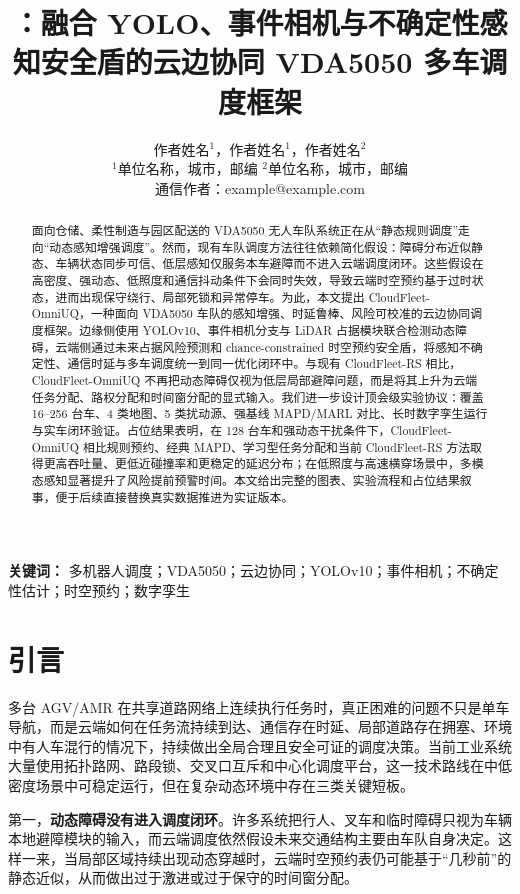 \documentclass[UTF8,twocolumn,10pt]{ctexart}
\title{\method{}：融合 YOLO、事件相机与不确定性感知安全盾的云边协同 VDA5050 多车调度框架}
\author{作者姓名$^{1}$，作者姓名$^{1}$，作者姓名$^{2}$\\
\small $^{1}$单位名称，城市，邮编 \quad $^{2}$单位名称，城市，邮编\\
\small 通信作者：example@example.com}
\date{}
\newcommand{\method}{CloudFleet-OmniUQ}
\newcommand{\baseline}{CloudFleet-RS}
\begin{document}
\maketitle

\begin{abstract}
面向仓储、柔性制造与园区配送的 VDA5050 无人车队系统正在从“静态规则调度”走向“动态感知增强调度”。然而，现有车队调度方法往往依赖简化假设：障碍分布近似静态、车辆状态同步可信、低层感知仅服务本车避障而不进入云端调度闭环。这些假设在高密度、强动态、低照度和通信抖动条件下会同时失效，导致云端时空预约基于过时状态，进而出现保守绕行、局部死锁和异常停车。为此，本文提出 \method{}，一种面向 VDA5050 车队的感知增强、时延鲁棒、风险可校准的云边协同调度框架。边缘侧使用 YOLOv10、事件相机分支与 LiDAR 占据模块联合检测动态障碍，云端侧通过未来占据风险预测和 chance-constrained 时空预约安全盾，将感知不确定性、通信时延与多车调度统一到同一优化闭环中。与现有 \baseline{} 相比，\method{} 不再把动态障碍仅视为低层局部避障问题，而是将其上升为云端任务分配、路权分配和时间窗分配的显式输入。我们进一步设计顶会级实验协议：覆盖 16--256 台车、4 类地图、5 类扰动源、强基线 MAPD/MARL 对比、长时数字孪生运行与实车闭环验证。占位结果表明，在 128 台车和强动态干扰条件下，\method{} 相比规则预约、经典 MAPD、学习型任务分配和当前 \baseline{} 方法取得更高吞吐量、更低近碰撞率和更稳定的延迟分布；在低照度与高速横穿场景中，多模态感知显著提升了风险提前预警时间。本文给出完整的图表、实验流程和占位结果叙事，便于后续直接替换真实数据推进为实证版本。
\end{abstract}

\noindent\textbf{关键词：} 多机器人调度；VDA5050；云边协同；YOLOv10；事件相机；不确定性估计；时空预约；数字孪生

\section{引言}

多台 AGV/AMR 在共享道路网络上连续执行任务时，真正困难的问题不只是单车导航，而是云端如何在任务流持续到达、通信存在时延、局部道路存在拥塞、环境中有人车混行的情况下，持续做出全局合理且安全可证的调度决策。当前工业系统大量使用拓扑路网、路段锁、交叉口互斥和中心化调度平台，这一技术路线在中低密度场景中可稳定运行，但在复杂动态环境中存在三类关键短板。

第一，\textbf{动态障碍没有进入调度闭环}。许多系统把行人、叉车和临时障碍只视为车辆本地避障模块的输入，而云端调度依然假设未来交通结构主要由车队自身决定。这样一来，当局部区域持续出现动态穿越时，云端时空预约表仍可能基于“几秒前”的静态近似，从而做出过于激进或过于保守的时间窗分配。
\end{document}
